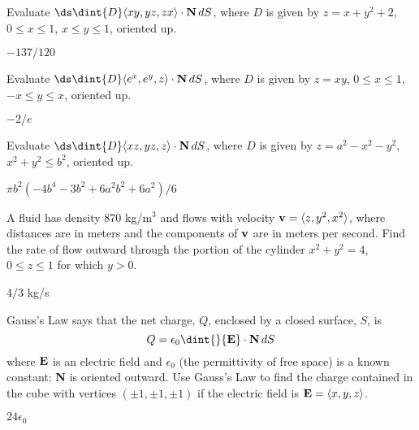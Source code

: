 \begin{exercises}
\begin{exercise} Evaluate $\ds \dint{D} \langle xy, yz,zx\rangle\cdot {\bf
  N}\,dS$, where $D$ is given by $z=x+y^2+2$, $0\le x\le 1$, $x\le
y\le 1$, oriented up.
\begin{answer} $-137/120$
\end{answer}\end{exercise}

\begin{exercise} Evaluate $\ds \dint{D} \langle e^x, e^y,z\rangle\cdot {\bf
  N}\,dS$, where $D$ is given by $z=xy$, $0\le x\le 1$, $-x\le
y\le x$, oriented up.
\begin{answer} $-2/e$
\end{answer}\end{exercise}

\begin{exercise} Evaluate $\ds \dint{D} \langle xz,yz,z\rangle\cdot {\bf
N}\,dS$, where $D$ is given by $z=a^2-x^2-y^2$, $x^2+y^2\le b^2$, 
oriented up.
\begin{answer} $\pi b^2(-4b^4-3b^2+6a^2b^2+6a^2)/6$
\end{answer}\end{exercise}

\begin{exercise} A fluid has density 870 kg/m$^3$ and flows with velocity ${\bf v} =
 \langle z,y^2,x^2\rangle$, where distances are in meters and the
 components of ${\bf v}$ are in meters per second.  Find the rate of flow
 outward through the portion of the cylinder $x^2+y^2 = 4$, $0\leq
 z\leq 1$ for which $y>0$.
\begin{answer} $4/3$ kg/s
\end{answer}\end{exercise}

\begin{exercise} Gauss's Law says that the net charge, $Q$,
enclosed by a closed surface, $S$, is 
$$Q=\epsilon_0 \dint{} {\bf E}\cdot {\bf N}\,dS$$ 
where ${\bf E}$ is an electric field and $\epsilon_0$ (the
permittivity of free space) is a known constant; {\bf N} is oriented
outward. 
Use Gauss's Law to find the charge contained in the cube with vertices
$(\pm 1, \pm 1, \pm 1)$ if the electric field is 
${\bf E} = \langle x,y,z\rangle$.
\begin{answer} $24\epsilon_0$
\end{answer}\end{exercise}

\end{exercises}


